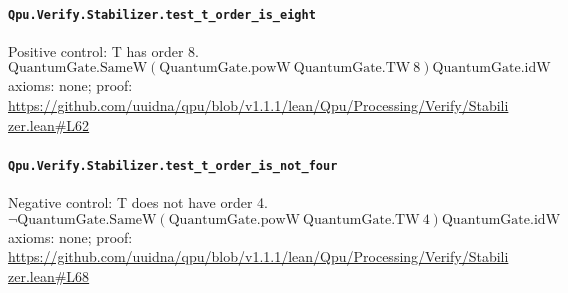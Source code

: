 \documentclass[11pt]{article}
\begin{document}
\paragraph{\texttt{Qpu.Verify.Stabilizer.test\_t\_order\_is\_eight}}
Positive control: T has order 8.
\[ \mathrm{QuantumGate.SameW} (\mathrm{QuantumGate.powW}\ \mathrm{QuantumGate.TW}\ 8) \mathrm{QuantumGate.idW} \]
\noindent axioms: none; proof: \url{https://github.com/uuidna/qpu/blob/v1.1.1/lean/Qpu/Processing/Verify/Stabilizer.lean\#L62}

\paragraph{\texttt{Qpu.Verify.Stabilizer.test\_t\_order\_is\_not\_four}}
Negative control: T does not have order 4.
\[ \neg \mathrm{QuantumGate.SameW} (\mathrm{QuantumGate.powW}\ \mathrm{QuantumGate.TW}\ 4) \mathrm{QuantumGate.idW} \]
\noindent axioms: none; proof: \url{https://github.com/uuidna/qpu/blob/v1.1.1/lean/Qpu/Processing/Verify/Stabilizer.lean\#L68}
\end{document}
